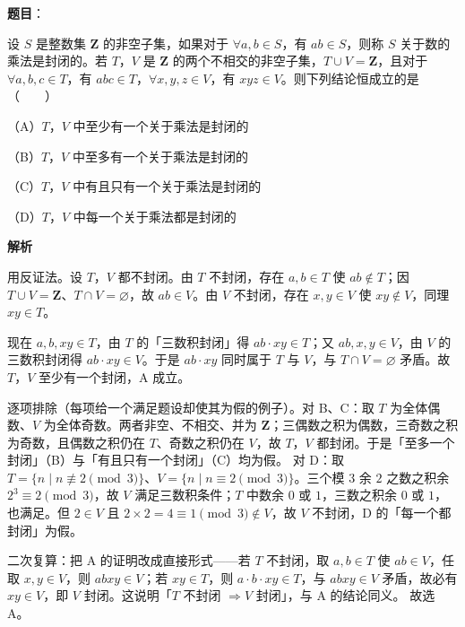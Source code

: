 \begin{answer}

\textbf{题目}：

设 $S$ 是整数集 $\mathbf Z$ 的非空子集，如果对于 $\forall a,b\in S$，有 $ab\in S$，则称 $S$ 关于数的乘法是封闭的。若 $T$，$V$ 是 $\mathbf Z$ 的两个不相交的非空子集，$T\cup V=\mathbf Z$，且对于 $\forall a,b,c\in T$，有 $abc\in T$，$\forall x,y,z\in V$，有 $xyz\in V$。则下列结论恒成立的是\mbox{（　　）}

（A）$T$，$V$ 中至少有一个关于乘法是封闭的

（B）$T$，$V$ 中至多有一个关于乘法是封闭的

（C）$T$，$V$ 中有且只有一个关于乘法是封闭的

（D）$T$，$V$ 中每一个关于乘法都是封闭的

\textbf{解析}

用反证法。设 $T$，$V$ 都不封闭。由 $T$ 不封闭，存在 $a,b\in T$ 使 $ab\notin T$；因 $T\cup V=\mathbf Z$、$T\cap V=\varnothing$，故 $ab\in V$。由 $V$ 不封闭，存在 $x,y\in V$ 使 $xy\notin V$，同理 $xy\in T$。

现在 $a,b,xy\in T$，由 $T$ 的「三数积封闭」得 $ab\cdot xy\in T$；又 $ab,x,y\in V$，由 $V$ 的三数积封闭得 $ab\cdot xy\in V$。于是 $ab\cdot xy$ 同时属于 $T$ 与 $V$，与 $T\cap V=\varnothing$ 矛盾。故 $T$，$V$ 至少有一个封闭，A 成立。

逐项排除（每项给一个满足题设却使其为假的例子）。对 B、C：取 $T$ 为全体偶数、$V$ 为全体奇数。两者非空、不相交、并为 $\mathbf Z$；三偶数之积为偶数，三奇数之积为奇数，且偶数之积仍在 $T$、奇数之积仍在 $V$，故 $T$，$V$ 都封闭。于是「至多一个封闭」（B）与「有且只有一个封闭」（C）均为假。 对 D：取 $T=\{n\mid n\not\equiv2\pmod 3\}$、$V=\{n\mid n\equiv2\pmod 3\}$。三个模 $3$ 余 $2$ 之数之积余 $2^3\equiv2\pmod3$，故 $V$ 满足三数积条件；$T$ 中数余 $0$ 或 $1$，三数之积余 $0$ 或 $1$，也满足。但 $2\in V$ 且 $2\times2=4\equiv1\pmod3\notin V$，故 $V$ 不封闭，D 的「每一个都封闭」为假。

二次复算：把 A 的证明改成直接形式——若 $T$ 不封闭，取 $a,b\in T$ 使 $ab\in V$，任取 $x,y\in V$，则 $abxy\in V$；若 $xy\in T$，则 $a\cdot b\cdot xy\in T$，与 $abxy\in V$ 矛盾，故必有 $xy\in V$，即 $V$ 封闭。这说明「$T$ 不封闭 $\Rightarrow V$ 封闭」，与 A 的结论同义。
故选 A。


\end{answer}
